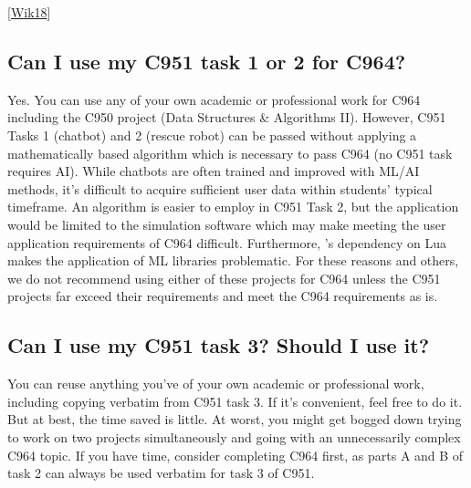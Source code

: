\documentclass[letterpaper,10pt,english]{jupyterBook}
\begin{document}
\sphinxAtStartPar
{[}\hyperlink{cite.resources:id2}{Wik18}{]}


\subsection{Can I use my C951 task 1 or 2 for C964?}
\label{\detokenize{task2_c/task2_part_c:can-i-use-my-c951-task-1-or-2-for-c964}}
\sphinxAtStartPar
Yes. You can use any of your own academic or professional work for C964 including the C950 project (Data Structures \& Algorithms II). However, C951 Tasks 1 (chatbot) and 2 (rescue robot) can be passed without applying a mathematically based algorithm which is necessary to pass C964 (no C951 task requires AI). While chatbots are often trained and improved with ML/AI methods, it’s difficult to acquire sufficient user data within students’ typical timeframe. An algorithm is easier to employ in C951 Task 2, but the application would be limited to the  simulation software which may make meeting the user application requirements of C964 difficult. Furthermore, ’s dependency on Lua makes the application of ML libraries problematic. For these reasons and others, we do not recommend using either of these projects for C964 \sphinxhyphen{}unless the C951 projects far exceed their requirements and meet the C964 requirements as is.


\subsection{Can I use my C951 task 3? Should I use it?}
\label{\detokenize{task2_c/task2_part_c:can-i-use-my-c951-task-3-should-i-use-it}}
\sphinxAtStartPar
You can reuse anything you’ve of your own academic or professional work, including copying verbatim from C951 task 3. If it’s convenient, feel free to do it. But at best, the time saved is little. At worst, you might get bogged down trying to work on two projects simultaneously and going with an unnecessarily complex C964 topic. If you have time, consider completing C964 first, as parts A and B of task 2 can always be used verbatim for task 3 of C951.
\end{document}
